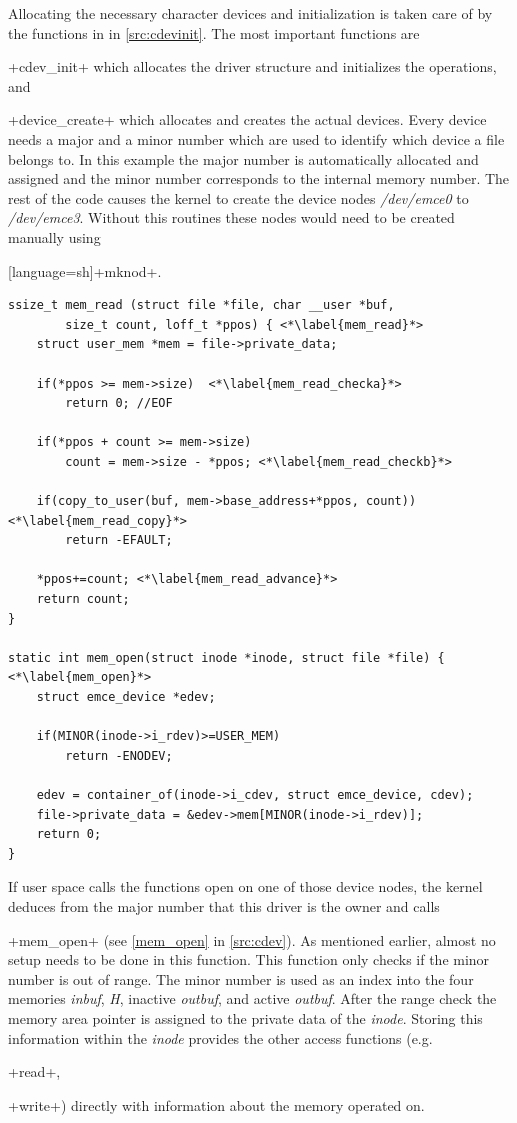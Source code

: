\documentclass[12pt,a4paper,parskip=full,abstract=true,BCOR=12mm,twoside,open=right]{scrreprt}
\newcommand{\hack}{}
\newcommand*{\SavedLstInline}{}
\DeclareRobustCommand*{\lstinline}{%
  \ifmmode
    \let\SavedBGroup\bgroup
    \def\bgroup{%
      \let\bgroup\SavedBGroup
      \hbox\bgroup
    }%
  \fi
  \SavedLstInline
}
\def\device#1{\mbox{\textit{#1}}}
\begin{document}
Allocating the necessary character devices and initialization is taken care of
by the functions in  in \cref{src:cdevinit}.
The most important functions are \lstinline+cdev_init+ which allocates the driver structure
and initializes the operations, and \lstinline+device_create+ which allocates
and creates the actual devices\cite{ldd}. Every device needs a major and a minor number
which are used to identify which device a file belongs to. In this example the
major number is automatically allocated and assigned and the minor number
corresponds to the internal memory number. The rest of the code
causes the kernel to create the device nodes \device{/dev/emce0} to
\device{/dev/emce3}. Without this routines these nodes would need to be created
manually using \lstinline[language=sh]+mknod+.

\begin{lstlisting}[float=htb,caption={Character device access functions},label=src:cdev,basicstyle=\hack\scriptsize]
ssize_t mem_read (struct file *file, char __user *buf,
		size_t count, loff_t *ppos) { <*\label{mem_read}*>
	struct user_mem *mem = file->private_data;

	if(*ppos >= mem->size)  <*\label{mem_read_checka}*>
		return 0; //EOF

	if(*ppos + count >= mem->size)
		count = mem->size - *ppos; <*\label{mem_read_checkb}*>

	if(copy_to_user(buf, mem->base_address+*ppos, count)) <*\label{mem_read_copy}*>
		return -EFAULT;

	*ppos+=count; <*\label{mem_read_advance}*>
	return count;
}

static int mem_open(struct inode *inode, struct file *file) { <*\label{mem_open}*>
	struct emce_device *edev;

	if(MINOR(inode->i_rdev)>=USER_MEM)
		return -ENODEV;

	edev = container_of(inode->i_cdev, struct emce_device, cdev);
	file->private_data = &edev->mem[MINOR(inode->i_rdev)];
	return 0;
}
\end{lstlisting}

If user space calls the functions open on one of those device nodes, the
kernel deduces from the major number that this driver is the owner and calls
\lstinline+mem_open+ (see \cref{mem_open} in \cref{src:cdev}). As mentioned earlier,
almost no setup needs to be done in this function. This function only checks if
the minor number is out of range. The minor number is used as an index
into the four memories \device{inbuf}, \device{H}, inactive \device{outbuf}, and
active \device{outbuf}. After the range check the memory area pointer is assigned
to the private data of the \device{inode}\cite{ldd}. Storing this information within the
\device{inode} provides the other access functions (e.g. \lstinline+read+,
\lstinline+write+) directly with information about the memory operated on.
\end{document}
